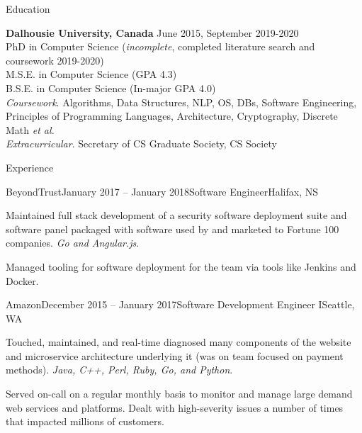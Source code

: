 \documentclass{resume} %
\begin{document}

\begin{rSection}{Education}

{\bf Dalhousie University, Canada} \hfill {June 2015, September 2019-2020} \\
PhD in Computer Science (\textit{incomplete}, completed literature search and coursework 2019-2020) \\
M.S.E. in Computer Science (GPA 4.3) \\
B.S.E. in Computer Science (In-major GPA 4.0) \smallskip \\
\textit{Coursework}. Algorithms, Data Structures, NLP, OS, DBs, Software Engineering, \\
Principles of Programming Languages, Architecture, Cryptography, Discrete Math \textit{et al.} \smallskip \\
\textit{Extracurricular}. Secretary of CS Graduate Society, CS Society

\end{rSection}


\begin{rSection}{Experience}

\begin{rSubsection}{BeyondTrust}{January 2017 -- January 2018}{Software Engineer}{Halifax, NS}
\item Maintained full stack development of a security software deployment suite and software panel packaged with software used by and marketed to Fortune 100 companies. \textit{Go and Angular.js}.
\item Managed tooling for software deployment for the team via tools like Jenkins and Docker.  
\end{rSubsection}


\begin{rSubsection}{Amazon}{December 2015 -- January 2017}{Software Development Engineer I}{Seattle, WA}
\item Touched, maintained, and real-time diagnosed many components of the website and microservice architecture underlying it (was on team focused on payment methods). \textit{Java, C++, Perl, Ruby, Go, and Python}.
\item Served on-call on a regular monthly basis to monitor and manage large demand web services and platforms. Dealt with high-severity issues a number of times that impacted millions of customers.
\end{rSubsection}

\end{rSection}
\end{document}
